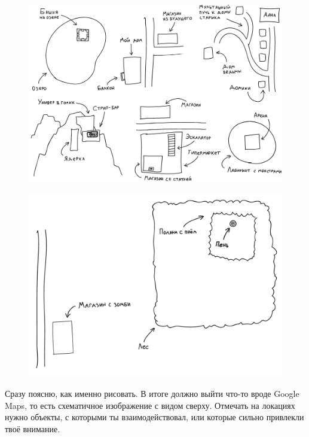 \documentclass[a5paper,12pt,twoside]{memoir}
\begin{document}
\begin{figure}[n]
\begin{center}
\includegraphics[width=14cm, angle=270]{ris21}
\end{center}
\caption{}
\label{primer1 }
\end{figure}	

\medskip

\begin{figure}[n]
\begin{center}
\includegraphics[width=14cm, angle=90]{ris22}
\end{center}
\caption{}
\label{primer2}
\end{figure}

Сразу поясню, как именно рисовать. В итоге должно выйти что-то вроде Google Maps, то есть схематичное изображение с видом сверху. Отмечать на локациях нужно объекты, с которыми ты взаимодействовал, или которые сильно привлекли твоё внимание.
 
\end{document}
